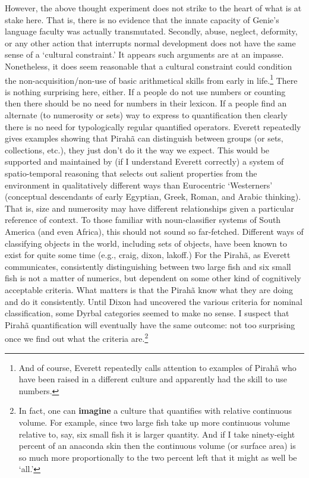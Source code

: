 \documentclass[11pt]{article}
\begin{document}
However, the above thought experiment does not strike to the heart of what is at stake here. That is, there is no evidence that the innate capacity of Genie's language faculty was actually transmutated. Secondly, abuse, neglect, deformity, or any other action that interrupts normal development does not have the same sense of a `cultural constraint.' It appears such arguments are at an impasse. Nonetheless, it does seem reasonable that a cultural constraint could condition the non-acquisition/non-use of basic arithmetical skills from early in life.\footnote{And of course, Everett repeatedly calls attention to examples of Pirah\~a who have been raised in a different culture and apparently had the skill to use numbers.} There is nothing surprising here, either. If a people do not use numbers or counting then there should be no need for numbers in their lexicon. If a people find an alternate (to numerosity or sets) way to express to quantification then clearly there is no need for typologically regular quantified operators. Everett repeatedly gives examples showing that Pirah\~a can distinguish between groups (or sets, collections, etc.), they just don't do it the way we expect. This would be supported and maintained by (if I understand Everett correctly) a system of spatio-temporal reasoning that selects out salient properties from the environment in qualitatively different ways than Eurocentric `Westerners' (conceptual descendants of early Egyptian, Greek, Roman, and Arabic thinking). That is, size and numerosity may have different relationships given a particular reference of context. To those familiar with noun-classifier systems of South America (and even Africa), this should not sound so far-fetched. Different ways of classifying objects in the world, including sets of objects, have been known to exist for quite some time (e.g., craig, dixon, lakoff.) For the Pirah\~a, as Everett communicates, consistently distinguishing between two large fish and six small fish is not a matter of numerics, but dependent on some other kind of cognitively acceptable criteria. What matters is that the Pirah\~a know what they are doing and do it consistently. Until Dixon had uncovered the various criteria for nominal classification, some Dyrbal categories seemed to make no sense. I suspect that Pirah\~a quantification will eventually have the same outcome: not too surprising once we find out what the criteria are.\footnote{In fact, one can {\bf imagine} a culture that quantifies with relative continuous volume. For example, since two large fish take up more continuous volume relative to, say, six small fish it is larger quantity. And if I take ninety-eight percent of an anaconda skin then the continuous volume (or surface area) is so much more proportionally to the two percent left that it might as well be `all.'}     
\end{document}
